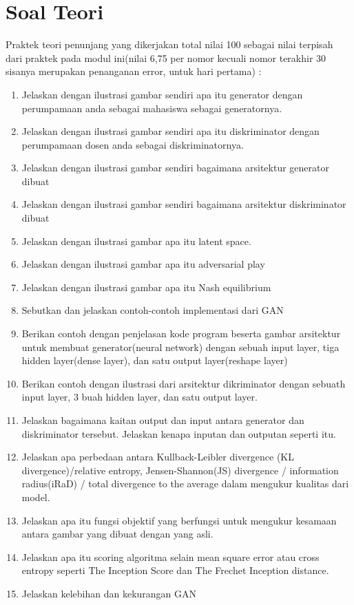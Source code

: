 \section{Soal Teori}
Praktek teori penunjang yang dikerjakan total nilai 100 sebagai nilai terpisah dari praktek pada modul ini(nilai 6,75 per nomor kecuali nomor terakhir 30 sisanya merupakan penanganan error, untuk hari pertama) :
\begin{enumerate}
\item
Jelaskan dengan ilustrasi gambar sendiri apa itu generator dengan perumpamaan anda sebagai mahasiswa sebagai generatornya.
\item
Jelaskan dengan ilustrasi gambar sendiri apa itu diskriminator dengan perumpamaan dosen anda sebagai diskriminatornya.
\item
Jelaskan dengan ilustrasi gambar sendiri bagaimana arsitektur generator dibuat
\item
Jelaskan dengan ilustrasi gambar sendiri bagaimana arsitektur diskriminator dibuat
\item
Jelaskan dengan ilustrasi gambar apa itu latent space.
\item
Jelaskan dengan ilustrasi gambar apa itu adversarial play
\item
Jelaskan dengan ilustrasi gambar apa itu Nash equilibrium
\item
Sebutkan dan jelaskan contoh-contoh implementasi dari GAN
\item
Berikan contoh dengan penjelasan kode program beserta gambar arsitektur untuk membuat generator(neural network) dengan sebuah input layer, tiga hidden layer(dense layer), dan satu output layer(reshape layer)
\item
Berikan contoh dengan ilustrasi dari arsitektur dikriminator dengan sebuath input layer, 3 buah hidden layer, dan satu output layer.
\item
Jelaskan bagaimana kaitan output dan input antara generator dan diskriminator tersebut. Jelaskan kenapa inputan dan outputan seperti itu.
\item 
Jelaskan apa perbedaan antara Kullback-Leibler divergence (KL divergence)/relative entropy, Jensen-Shannon(JS) divergence / information radius(iRaD) / total divergence to the average dalam mengukur kualitas dari model.
\item
Jelaskan apa itu fungsi objektif yang berfungsi untuk mengukur kesamaan antara gambar yang dibuat dengan yang asli.
\item
Jelaskan apa itu scoring algoritma selain mean square error atau cross entropy seperti The Inception Score dan The Frechet Inception distance.
\item
Jelaskan kelebihan dan kekurangan GAN
\end{enumerate}



